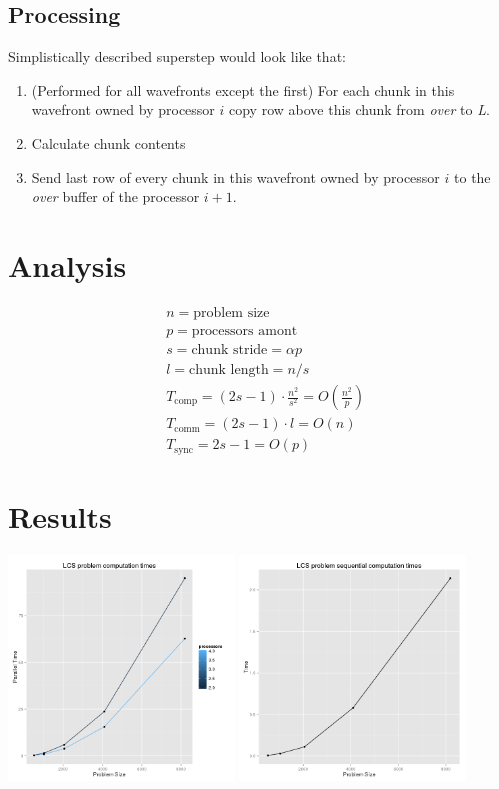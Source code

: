 \documentclass[a4paper]{article}
\begin{document}
\subsection{Processing}
Simplistically described superstep would look like that:
\begin{enumerate}
    \item  (Performed for all wavefronts except the first) For each chunk in this wavefront owned by processor $i$ copy row above this chunk from \textit{over} to \textit{L}. 
    \item Calculate chunk contents
    \item Send last row of every chunk in this wavefront owned by processor $i$ to the \textit{over} buffer of the processor $i+1$.
\end{enumerate}
\section{Analysis}
\begin{align*}
    &  n = \text{problem size}\\
    &  p = \text{processors amont}\\
    &  s = \text{chunk stride} = \alpha  p\\
    &  l = \text{chunk length} = n/s\\
    &  T_{\text{comp}} = (2s-1) \cdot {\frac{n^2}{s^2}} = O(\frac{n^2}{p})\\
    &  T_{\text{comm}} = (2s-1) \cdot l = O(n)\\
    &  T_{\text{sync}} = 2s-1 = O(p)
\end{align*}

\section{Results}
    \includegraphics[width=0.45\textwidth]{lcs}
    \includegraphics[width=0.45\textwidth]{lcs-seq}
\end{document}
